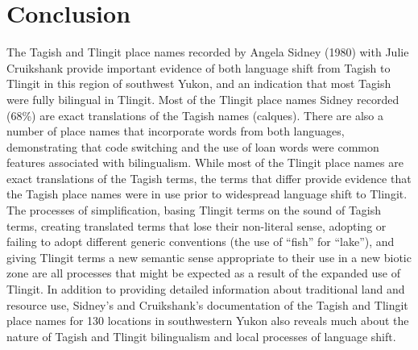 \section{Conclusion}
The Tagish and Tlingit place names recorded by Angela Sidney (1980) with Julie Cruikshank provide important evidence of both language shift from Tagish to Tlingit in this region of southwest Yukon, and an indication that most Tagish were fully bilingual in Tlingit. Most of the Tlingit place names Sidney recorded (68\%) are exact translations of the Tagish names (calques). There are also a number of place names that incorporate words from both languages, demonstrating that code switching and the use of loan words were common features associated with bilingualism. While most of the Tlingit place names are exact translations of the Tagish terms, the terms that differ provide evidence that the Tagish place names were in use prior to widespread language shift to Tlingit. The processes of simplification, basing Tlingit terms on the sound of Tagish terms, creating translated terms that lose their non-literal sense, adopting or failing to adopt different generic conventions (the use of “fish” for “lake”), and giving Tlingit terms a new semantic sense appropriate to their use in a new biotic zone are all processes that might be expected as a result of the expanded use of Tlingit. In addition to providing detailed information about traditional land and resource use, Sidney’s and Cruikshank’s documentation of the Tagish and Tlingit place names for 130 locations in southwestern Yukon also reveals much about the nature of Tagish and Tlingit bilingualism and local processes of language shift.





